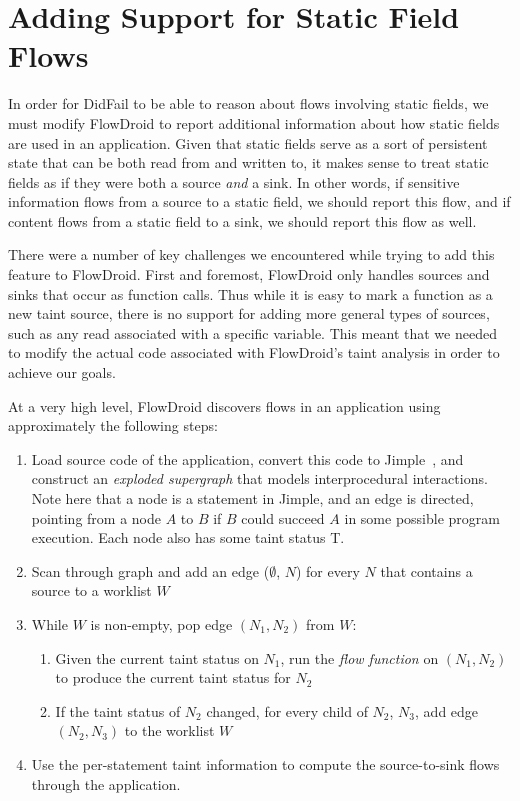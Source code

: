 \section{Adding Support for Static Field Flows}

In order for DidFail to be able to reason about flows involving static fields, we must modify FlowDroid to report additional information about how static fields are used in an application. Given that static fields serve as a sort of persistent state that can be both read from and written to, it makes sense to treat static fields as if they were both a source \emph{and} a sink. In other words, if sensitive information flows from a source to a static field, we should report this flow, and if content flows from a static field to a sink, we should report this flow as well.

There were a number of key challenges we encountered while trying to add this feature to FlowDroid. First and foremost, FlowDroid only handles sources and sinks that occur as function calls. Thus while it is easy to mark a function as a new taint source, there is no support for adding more general types of sources, such as any read associated with a specific variable. This meant that we needed to modify the actual code associated with FlowDroid's taint analysis in order to achieve our goals.

At a very high level, FlowDroid discovers flows in an application using approximately the following steps:
\begin{enumerate}
\item Load source code of the application, convert this code to Jimple~\cite{soot}, and construct an \emph{exploded supergraph} that models interprocedural interactions. Note here that a node is a statement in Jimple, and an edge is directed, pointing from a node $A$ to $B$ if $B$ could succeed $A$ in some possible program execution. Each node also has some taint status T.
\item Scan through graph and add an edge ($\emptyset$, $N$) for every $N$ that contains a source to a worklist $W$
\item While $W$ is non-empty, pop edge $(N_1, N_2)$ from $W$:
\begin{enumerate}
\item Given the current taint status on $N_1$, run the \emph{flow function} on $(N_1, N_2)$ to produce the current taint status for $N_2$
\item If the taint status of $N_2$ changed, for every child of $N_2$, $N_3$, add edge $(N_2, N_3)$ to the worklist $W$
\end{enumerate}
\item Use the per-statement taint information to compute the source-to-sink flows through the application.
\end{enumerate}

